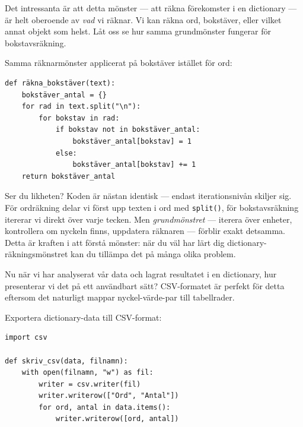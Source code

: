 Det intressanta är att detta mönster --- att räkna förekomster i en dictionary --- är helt oberoende av \emph{vad} vi räknar. Vi kan räkna ord, bokstäver, eller vilket annat objekt som helst. Låt oss se hur samma grundmönster fungerar för bokstavsräkning.

\begin{frame}[fragile]
  \begin{example}
    Samma räknarmönster applicerat på bokstäver istället för ord:
    \begin{verbatim}
def räkna_bokstäver(text):
    bokstäver_antal = {}
    for rad in text.split("\n"):
        for bokstav in rad:
            if bokstav not in bokstäver_antal:
                bokstäver_antal[bokstav] = 1
            else:
                bokstäver_antal[bokstav] += 1
    return bokstäver_antal
    \end{verbatim}
  \end{example}
\end{frame}


Ser du likheten? Koden är nästan identisk --- endast iterationsnivån skiljer sig. För ordräkning delar vi först upp texten i ord med \texttt{split()}, för bokstavsräkning itererar vi direkt över varje tecken. Men \emph{grundmönstret} --- iterera över enheter, kontrollera om nyckeln finns, uppdatera räknaren --- förblir exakt detsamma. Detta är kraften i att förstå mönster: när du väl har lärt dig dictionary-räkningsmönstret kan du tillämpa det på många olika problem.

Nu när vi har analyserat vår data och lagrat resultatet i en dictionary, hur presenterar vi det på ett användbart sätt? CSV-formatet är perfekt för detta eftersom det naturligt mappar nyckel-värde-par till tabellrader.

\begin{frame}[fragile]
  \begin{example}
    Exportera dictionary-data till CSV-format:
    \begin{verbatim}
import csv

def skriv_csv(data, filnamn):
    with open(filnamn, "w") as fil:
        writer = csv.writer(fil)
        writer.writerow(["Ord", "Antal"])
        for ord, antal in data.items():
            writer.writerow([ord, antal])
    \end{verbatim}
  \end{example}
\end{frame}

